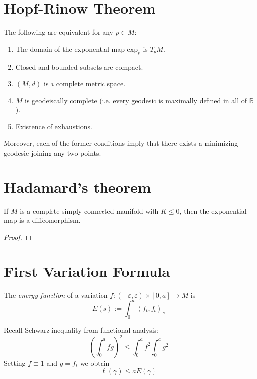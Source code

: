 \section{Hopf-Rinow Theorem}
\label{section-Hopf-Rinow-theorem}

\begin{theorem}
\label{theorem-Hopf-Rinow}
The following are equivalent for any $p \in M$:
\begin{enumerate}
\item The domain of the exponential map $\text{exp}_p$ is $T_pM$.
\item Closed and bounded subsets are compact.
\item $(M,d)$ is a complete metric space.
\item $M$ is geodeiscally complete (i.e. every geodesic is maximally defined in
all of $\mathbb{R}$).
\item Existence of exhaustions.
\end{enumerate}
Moreover, each of the former conditions imply that there exists a minimizing 
geodesic joining any two points.
\end{theorem}

\section{Hadamard's theorem}
\label{section-Hadamard}

\begin{theorem}[Hadamard]
\label{theorem-Hadamard}
If $M$ is a complete simply connected manifold with $K\leq 0$, then the 
exponential map is a diffeomorphism.
\end{theorem}

\begin{proof}

\end{proof}

\section{First Variation Formula}
\label{section-first-variation}

\begin{definition}
\label{definition-energy}
The {\it energy function} of a variation
$f:(-\varepsilon,\varepsilon)\times[0,a]\to M$ is
$$
E(s):=\int_0^a\left<f_t,f_t\right>_s
$$
\end{definition}

Recall Schwarz inequality from functional analysis:
$$
\left(\int_0^afg\right)^2\leq \int_0^af^2\int_0^ag^2
$$
Setting $f\equiv1$ and $g=f_t$ we obtain
 \begin{equation}
\label{equation-energy-bounds-length}
\ell(\gamma)\leq aE(\gamma)
\end{equation}


